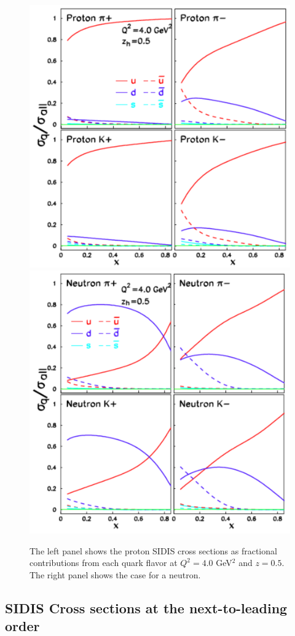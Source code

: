 \begin{figure}[tbhp]
   \includegraphics[width=0.51\linewidth]{figs_xj/crossq_ratio_proton_052014.pdf}
    \includegraphics[width=0.51\linewidth]{figs_xj/crossq_ratio_neutron_052014.pdf} \\
\caption{\label{fig:crossq} The left panel shows the  
proton SIDIS cross sections as fractional contributions from 
each quark flavor at $Q^2=4.0$ GeV$^2$ and $z=0.5$.
The right panel shows the case for a neutron. 
}
\end{figure}

\subsection{SIDIS Cross sections at the next-to-leading order}


